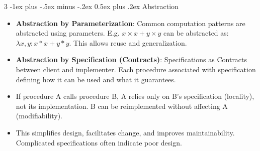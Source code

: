 \documentclass[a4paper, 9pt, landscape]{extarticle}
\makeatletter
\renewcommand{\subsection}{\@startsection{subsubsection}{3}{0mm}%
                                {-1ex plus -.5ex minus -.2ex}%
                                {0.5ex plus .2ex}%
                                {\normalfont\small\bfseries}}
\makeatother
\begin{document}
\begin{multicols*}{3}
\subsection{Abstraction}
\begin{itemize}
  \item \textbf{Abstraction by Parameterization}: Common computation patterns are abstracted using parameters. E.g. $x \times x + y \times y$ can be abstracted as: $\lambda x, y: x*x + y*y$. This allows reuse and generalization.
  \item \textbf{Abstraction by Specification (Contracts)}: Specifications as Contracts between client and implementer. Each procedure associated with specification defining how it can be used and what it guarantees. 
  \item If procedure A calls procedure B, A relies only on B's specification (locality), not its implementation. B can be reimplemented without affecting A (modifiability).
  \item This simplifies design, facilitates change, and improves maintainability. Complicated specifications often indicate poor design.
\end{itemize}


\end{multicols*}
\end{document}
